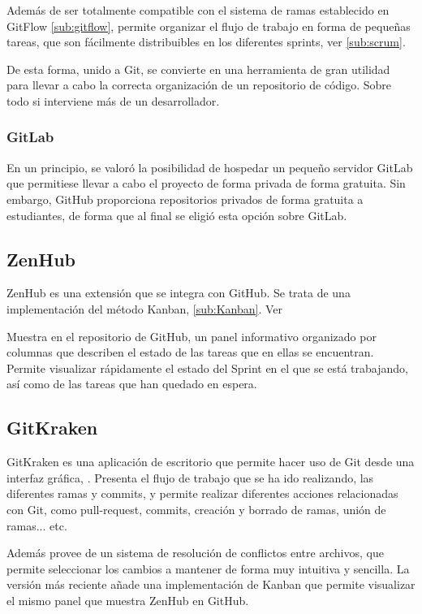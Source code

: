 Además de ser totalmente compatible con el sistema de ramas establecido en GitFlow \ref{sub:gitflow}, permite organizar el flujo de trabajo en forma de pequeñas tareas, que son fácilmente distribuibles en los diferentes sprints, ver \ref{sub:scrum}. 

De esta forma, unido a Git, se convierte en una herramienta de gran utilidad para llevar a cabo la correcta organización de un repositorio de código. Sobre todo si interviene más de un desarrollador. 

\subsubsection{GitLab}
En un principio, se valoró la posibilidad de hospedar un pequeño servidor GitLab que permitiese llevar a cabo el proyecto de forma privada de forma gratuita. Sin embargo, GitHub proporciona repositorios privados de forma gratuita a estudiantes, de forma que al final se eligió esta opción sobre GitLab.

\subsection{ZenHub}

ZenHub es una extensión que se integra con GitHub. Se trata de una implementación del método Kanban, \ref{sub:Kanban}. Ver \citep{wiki:ZenHub}

Muestra en el repositorio de GitHub, un panel informativo organizado por columnas que describen el estado de las tareas que en ellas se encuentran. 
Permite visualizar rápidamente el estado del Sprint en el que se está trabajando, así como de las tareas que han quedado en espera.

\subsection{GitKraken}

GitKraken es una aplicación de escritorio que permite hacer uso de Git desde una interfaz gráfica, \citep{wiki:GitKraken}. Presenta el flujo de trabajo que se ha ido realizando, las diferentes ramas y commits, y permite realizar diferentes acciones relacionadas con Git, como pull-request, commits, creación y borrado de ramas, unión de ramas... etc.

Además provee de un sistema de resolución de conflictos entre archivos, que permite seleccionar los cambios a mantener de forma muy intuitiva y sencilla. 
La versión más reciente añade una implementación de Kanban que permite visualizar el mismo panel que muestra ZenHub en GitHub.

